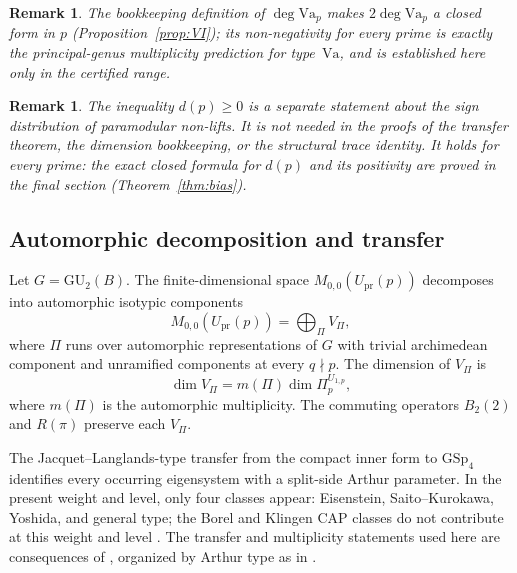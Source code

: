 \documentclass[10pt,a4paper]{amsart}
\newtheorem{remark}[theorem]{Remark}
\newcommand{\GU}{\mathrm{GU}}
\newcommand{\GSp}{\mathrm{GSp}}
\newcommand{\Upr}{U_{\mathrm{pr}}}
\newcommand{\Va}{\mathrm{Va}}
\providecommand{\Upr}{U_{\mathrm{pr}}}
\providecommand{\Va}{\mathrm{Va}}
\begin{document}
	\begin{remark}
		The bookkeeping definition of $\deg\Va_p$ makes $2\deg\Va_p$ a closed
		form in $p$ (Proposition~\ref{prop:VI}); its non-negativity for
		every prime is exactly the principal-genus multiplicity prediction for
		type~$\Va$, and is established here only in the certified range.
	\end{remark}
	
	\begin{remark}\label{rem:dp-status}
		The inequality $d(p)\ge0$ is a separate statement about the sign distribution
		of paramodular non-lifts. It is not needed in the proofs of the transfer
		theorem, the dimension bookkeeping, or the structural trace identity. It
		holds for every prime: the exact closed formula for $d(p)$ and its
		positivity are proved in the final section (Theorem~\ref{thm:bias}).
	\end{remark}
	
	\subsection{Automorphic decomposition and transfer}
	\label{ss:automorphic-transfer}
	
	Let $G=\GU_2(B)$. The finite-dimensional space
	$M_{0,0}(\Upr(p))$ decomposes into automorphic isotypic components
	\[
	M_{0,0}(\Upr(p))=\bigoplus_{\Pi}V_\Pi,
	\]
	where $\Pi$ runs over automorphic representations of $G$ with trivial
	archimedean component and unramified components at every $q\nmid p$.
	The dimension of $V_\Pi$ is
	\[
	\dim V_\Pi=m(\Pi)\dim\Pi_p^{U_{1,p}},
	\]
	where $m(\Pi)$ is the automorphic multiplicity. The commuting operators
	$B_2(2)$ and $R(\pi)$ preserve each $V_\Pi$.
	
	The Jacquet--Langlands-type transfer from the compact inner form to
	$\GSp_4$ identifies every occurring eigensystem with a split-side Arthur
	parameter. In the present weight and level, only four classes appear:
	Eisenstein, Saito--Kurokawa, Yoshida, and general type; the Borel and
	Klingen CAP classes do not contribute at this weight and level
	\cite[proof of Thm.~9.6]{DPRT}. The transfer and
	multiplicity statements used here are consequences of
	\cite{RoesnerWeissauer2021,vanHoften,DPRT}, organized by Arthur type as in
	\cite{Schmidt2018}.
	
\end{document}
